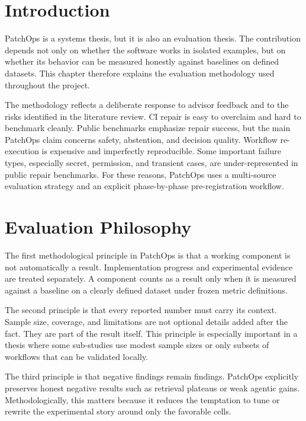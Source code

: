 \section{Introduction}

PatchOps is a systems thesis, but it is also an evaluation thesis. The contribution depends not only on whether
the software works in isolated examples, but on whether its behavior can be measured honestly against baselines
on defined datasets. This chapter therefore explains the evaluation methodology used throughout the project.

The methodology reflects a deliberate response to advisor feedback and to the risks identified in the literature
review. CI repair is easy to overclaim and hard to benchmark cleanly. Public benchmarks emphasize repair
success, but the main PatchOps claim concerns safety, abstention, and decision quality. Workflow re-execution is
expensive and imperfectly reproducible. Some important failure types, especially secret, permission, and
transient cases, are under-represented in public repair benchmarks. For these reasons, PatchOps uses a
multi-source evaluation strategy and an explicit phase-by-phase pre-registration workflow.

\section{Evaluation Philosophy}

The first methodological principle in PatchOps is that a working component is not automatically a result.
Implementation progress and experimental evidence are treated separately. A component counts as a result only
when it is measured against a baseline on a clearly defined dataset under frozen metric definitions.

The second principle is that every reported number must carry its context. Sample size, coverage, and
limitations are not optional details added after the fact. They are part of the result itself. This principle
is especially important in a thesis where some sub-studies use modest sample sizes or only subsets of workflows
that can be validated locally.

The third principle is that negative findings remain findings. PatchOps explicitly preserves honest negative
results such as retrieval plateaus or weak agentic gains. Methodologically, this matters because it reduces the
temptation to tune or rewrite the experimental story around only the favorable cells.

